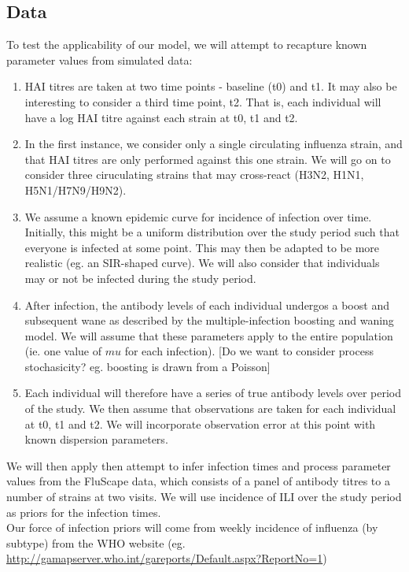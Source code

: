 \documentclass[a4paper,11pt,twoside]{article}
\begin{document}
\subsection{Data}
To test the applicability of our model, we will attempt to recapture known parameter values from simulated data:
\begin{enumerate}
\item HAI titres are taken at two time points - baseline (t0) and t1. It may also be interesting to consider a third time point, t2. That is, each individual will have a log HAI titre against each strain at t0, t1 and t2.
\item In the first instance, we consider only a single circulating influenza strain, and that HAI titres are only performed against this one strain. We will go on to consider three ciruculating strains that may cross-react (H3N2, H1N1, H5N1/H7N9/H9N2).
\item We assume a known epidemic curve for incidence of infection over time. Initially, this might be a uniform distribution over the study period such that everyone is infected at some point. This may then be adapted to be more realistic (eg. an SIR-shaped curve). We will also consider that individuals may or not be infected during the study period.
\item After infection, the antibody levels of each individual undergos a boost and subsequent wane as described by the multiple-infection boosting and waning model. We will assume that these parameters apply to the entire population (ie. one value of $mu$ for each infection). [Do we want to consider process stochasicity? eg. boosting is drawn from a Poisson]
\item Each individual will therefore have a series of true antibody levels over period of the study. We then assume that observations are taken for each individual at t0, t1 and t2. We will incorporate observation error at this point with known dispersion parameters.
\end{enumerate}

We will then apply then attempt to infer infection times and process parameter values from the FluScape data, which consists of a panel of antibody titres to a number of strains at two visits. We will use incidence of ILI over the study period as priors for the infection times.\\

Our force of infection priors will come from weekly incidence of influenza (by subtype) from the WHO website (eg. \url{http://gamapserver.who.int/gareports/Default.aspx?ReportNo=1})\\
\end{document}
